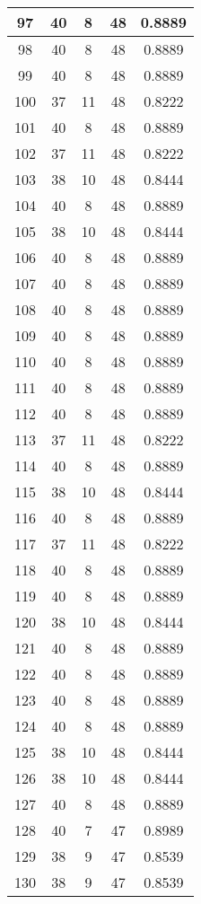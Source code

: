\documentclass[letterpaper, 12pt]{article}
\begin{document}
\begin{longtable}{|c|c|c|c|c|}
\hline
97 & 40 & 8 & 48 & 0.8889 \\
\hline
98 & 40 & 8 & 48 & 0.8889 \\
\hline
99 & 40 & 8 & 48 & 0.8889 \\
\hline
100 & 37 & 11 & 48 & 0.8222 \\
\hline
101 & 40 & 8 & 48 & 0.8889 \\
\hline
102 & 37 & 11 & 48 & 0.8222 \\
\hline
103 & 38 & 10 & 48 & 0.8444 \\
\hline
104 & 40 & 8 & 48 & 0.8889 \\
\hline
105 & 38 & 10 & 48 & 0.8444 \\
\hline
106 & 40 & 8 & 48 & 0.8889 \\
\hline
107 & 40 & 8 & 48 & 0.8889 \\
\hline
108 & 40 & 8 & 48 & 0.8889 \\
\hline
109 & 40 & 8 & 48 & 0.8889 \\
\hline
110 & 40 & 8 & 48 & 0.8889 \\
\hline
111 & 40 & 8 & 48 & 0.8889 \\
\hline
112 & 40 & 8 & 48 & 0.8889 \\
\hline
113 & 37 & 11 & 48 & 0.8222 \\
\hline
114 & 40 & 8 & 48 & 0.8889 \\
\hline
115 & 38 & 10 & 48 & 0.8444 \\
\hline
116 & 40 & 8 & 48 & 0.8889 \\
\hline
117 & 37 & 11 & 48 & 0.8222 \\
\hline
118 & 40 & 8 & 48 & 0.8889 \\
\hline
119 & 40 & 8 & 48 & 0.8889 \\
\hline
120 & 38 & 10 & 48 & 0.8444 \\
\hline
121 & 40 & 8 & 48 & 0.8889 \\
\hline
122 & 40 & 8 & 48 & 0.8889 \\
\hline
123 & 40 & 8 & 48 & 0.8889 \\
\hline
124 & 40 & 8 & 48 & 0.8889 \\
\hline
125 & 38 & 10 & 48 & 0.8444 \\
\hline
126 & 38 & 10 & 48 & 0.8444 \\
\hline
127 & 40 & 8 & 48 & 0.8889 \\
\hline
128 & 40 & 7 & 47 & 0.8989 \\
\hline
129 & 38 & 9 & 47 & 0.8539 \\
\hline
130 & 38 & 9 & 47 & 0.8539 \\

\end{longtable}
\end{document}
